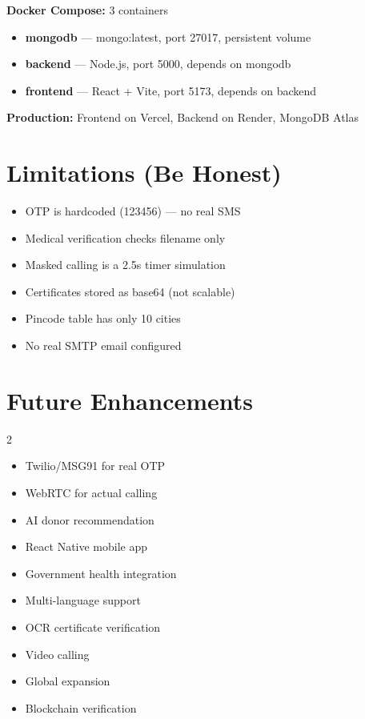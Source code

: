 \documentclass[10pt,a4paper]{article}
\begin{document}
\textbf{Docker Compose:} 3 containers
\begin{itemize}
    \item \textbf{mongodb} --- mongo:latest, port 27017, persistent volume
    \item \textbf{backend} --- Node.js, port 5000, depends on mongodb
    \item \textbf{frontend} --- React + Vite, port 5173, depends on backend
\end{itemize}

\textbf{Production:} Frontend on Vercel, Backend on Render, MongoDB Atlas

\section{Limitations (Be Honest)}

\begin{itemize}
    \item OTP is hardcoded (123456) --- no real SMS
    \item Medical verification checks filename only
    \item Masked calling is a 2.5s timer simulation
    \item Certificates stored as base64 (not scalable)
    \item Pincode table has only 10 cities
    \item No real SMTP email configured
\end{itemize}

\section{Future Enhancements}

\begin{multicols}{2}
\begin{itemize}
    \item Twilio/MSG91 for real OTP
    \item WebRTC for actual calling
    \item AI donor recommendation
    \item React Native mobile app
    \item Government health integration
    \item Multi-language support
    \item OCR certificate verification
    \item Video calling
    \item Global expansion
    \item Blockchain verification
\end{itemize}
\end{multicols}
\end{document}
